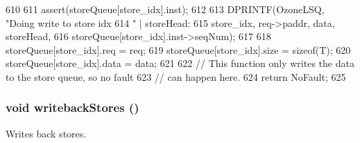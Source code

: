 \begin{DoxyCode}
610 {
611     assert(storeQueue[store_idx].inst);
612 
613     DPRINTF(OzoneLSQ, "Doing write to store idx %
614             " | storeHead:%
615             store_idx, req->paddr, data, storeHead,
616             storeQueue[store_idx].inst->seqNum);
617 
618     storeQueue[store_idx].req = req;
619     storeQueue[store_idx].size = sizeof(T);
620     storeQueue[store_idx].data = data;
621 
622     // This function only writes the data to the store queue, so no fault
623     // can happen here.
624     return NoFault;
625 }
\end{DoxyCode}
\hypertarget{classOzoneLSQ_a5f04e29d6f6feb8b86460491f2ba7547}{
\subsubsection[{writebackStores}]{\setlength{\rightskip}{0pt plus 5cm}void writebackStores ()}}
\label{classOzoneLSQ_a5f04e29d6f6feb8b86460491f2ba7547}
Writes back stores. 


